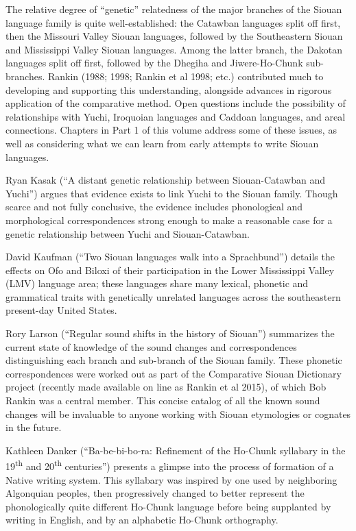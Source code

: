 \begin{refsection}

The relative degree of ``genetic'' relatedness of the major branches of the Siouan language family is quite well-established: the Catawban languages split off first, then the Missouri Valley Siouan languages, followed by the Southeastern Siouan and Mississippi Valley Siouan languages. Among the latter branch, the Dakotan languages split off first, followed by the Dhegiha and Jiwere-Ho-Chunk sub-branches. Rankin (1988; 1998; Rankin et al 1998; etc.) contributed much to developing and supporting this understanding, alongside advances in rigorous application of the comparative method. Open questions include the possibility of relationships with Yuchi, Iroquoian languages and Caddoan languages, and areal connections. Chapters in Part 1 of this volume address some of these issues, as well as considering what we can learn from early attempts to write Siouan languages.

Ryan Kasak (``A distant genetic relationship between Siouan-Catawban and Yuchi'') argues that evidence exists to link Yuchi to the Siouan family. Though scarce and not fully conclusive, the evidence includes phonological and morphological correspondences strong enough to make a reasonable case for a genetic relationship between Yuchi and Siouan-Catawban. 

David Kaufman (``Two Siouan languages walk into a Sprachbund'') details the effects on Ofo and Biloxi of their participation in the Lower Mississippi Valley (LMV) language area; these languages share many lexical, phonetic and grammatical traits with genetically unrelated languages across the southeastern present-day United States. 

Rory Larson (``Regular sound shifts in the history of Siouan'') summarizes the current state of knowledge of the sound changes and correspondences distinguishing each branch and sub-branch of the Siouan family. These phonetic correspondences were worked out as part of the Comparative Siouan Dictionary project (recently made available on line as Rankin et al 2015), of which Bob Rankin was a central member. This concise catalog of all the known sound changes will be invaluable to anyone working with Siouan etymologies or cognates in the future.

Kathleen Danker (``Ba-be-bi-bo-ra: Refinement of the Ho-Chunk syllabary in the 19\textsuperscript{th} and 20\textsuperscript{th} centuries'') presents a glimpse into the process of formation of a Native writing system. This syllabary was inspired by one used by neighboring Algonquian peoples, then progressively changed to better represent the phonologically quite different Ho-Chunk language before being supplanted by writing in English, and by an alphabetic Ho-Chunk orthography.


\end{refsection}
